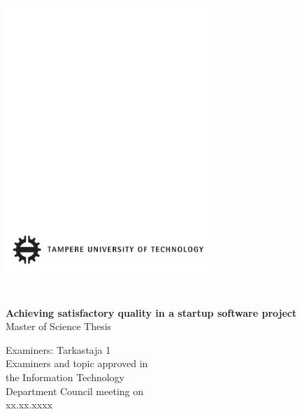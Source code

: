  
\thispagestyle{empty}
 
\vspace*{-.5cm}\noindent
 
 
\includegraphics[width=8cm]{tillbehor/tut-logo}
 
\vspace{6.8cm}
 
\\
{\bf\large \textsf{Achieving satisfactory quality in a startup software project}}\\
\textsf{Master of Science Thesis}
 
\vspace{8.7cm} %
 
\begin{flushright}
  
\begin{minipage}[c]{6.8cm}
\begin{spacing}{1.0}
\textsf{Examiners: Tarkastaja 1}\\
\textsf{Examiners and topic approved in}\\ 
\textsf{the Information Technology}\\
\textsf{Department Council meeting on}\\
\textsf{xx.xx.xxxx}\\
\end{spacing}
\end{minipage}
\end{flushright}
 

